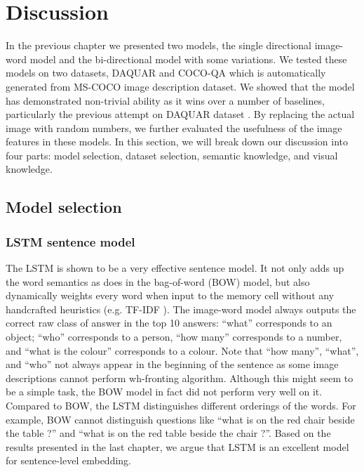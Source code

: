 \chapter{Discussion}

In the previous chapter we presented two models, the single directional image-word model and the bi-directional model with some variations. We tested these models on two datasets, DAQUAR \cite{malinowski14b} and COCO-QA which is automatically generated from MS-COCO image description dataset. We showed that the model has demonstrated non-trivial ability as it wins over a number of baselines, particularly the previous attempt on DAQUAR dataset \cite{malinowski14b}. By replacing the actual image with random numbers, we further evaluated the usefulness of the image features in these models. In this section, we will break down our discussion into four parts: model selection, dataset selection, semantic knowledge, and visual knowledge.

\section{Model selection}
\subsection{LSTM sentence model}
The LSTM is shown to be a very effective sentence model. It not only adds up the word semantics as does in the bag-of-word (BOW) model, but also dynamically weights every word when input to the memory cell without any handcrafted heuristics (e.g. TF-IDF \cite{salton88}). The image-word model always outputs the correct raw class of answer in the top 10 answers: ``what'' corresponds to an object; ``who'' corresponds to a person, ``how many'' corresponds to a number, and ``what is the colour'' corresponds to a colour. Note that ``how many'', ``what'', and ``who'' not always appear in the beginning of the sentence as some image descriptions cannot perform wh-fronting algorithm. Although this might seem to be a simple task, the BOW model in fact did not perform very well on it. Compared to BOW, the LSTM distinguishes different orderings of the words. For example, BOW cannot distinguish questions like ``what is on the red chair beside the table ?'' and ``what is on the red table beside the chair ?''. Based on the results presented in the last chapter, we argue that LSTM is an excellent model for sentence-level embedding.

